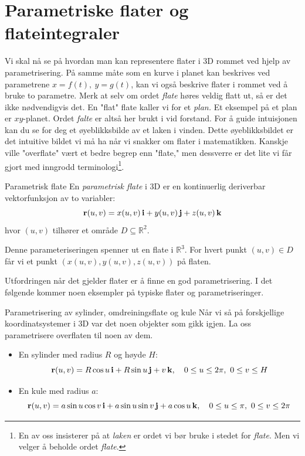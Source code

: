 \section{Parametriske flater og flateintegraler}

Vi skal nå se på hvordan man kan representere flater i 3D rommet ved hjelp av parametrisering. På samme måte som en kurve i planet kan beskrives ved parametrene \( x = f(t),\ y = g(t) \), kan vi også beskrive flater i rommet ved å bruke to parametre. Merk at selv om ordet \textit{flate} høres veldig flatt ut, så er det ikke nødvendigvis det. En "flat" flate kaller vi for et \textit{plan.} Et eksempel på et plan er $xy$-planet. 
Ordet \textit{falte} er altså her brukt i vid forstand. For å guide intuisjonen kan du se for deg et øyeblikksbilde av et laken i vinden. Dette øyeblikksbildet er det intuitive bildet vi må ha når vi snakker om flater i matematikken. Kanskje ville "overflate" vært et bedre begrep enn "flate," men dessverre er det lite vi får gjort med inngrodd terminologi\footnote{En av oss insisterer på at \textit{laken} er ordet vi bør bruke i stedet for \textit{flate}. Men vi velger å beholde ordet \textit{flate}.}.


\begin{defn}{Parametrisk flate}
En \emph{parametrisk flate} i 3D er en kontinuerlig deriverbar vektorfunksjon av to variabler:
\[
\mathbf{r}(u, v) = x(u, v)\, \mathbf{i} + y(u, v)\, \mathbf{j} + z(u, v)\, \mathbf{k}
\]
hvor \( (u, v) \) tilhører et område \( D \subseteq \mathbb{R}^2 \).

Denne parameteriseringen spenner ut en flate i \( \mathbb{R}^3 \). For hvert punkt \( (u, v) \in D \) får vi et punkt \( (x(u,v), y(u,v), z(u,v)) \) på flaten.
\end{defn}
Utfordringen når det gjelder flater er å finne en god parametrisering. I det følgende kommer noen eksempler på typiske flater og parametriseringer.
\begin{eks}{Parametrisering av sylinder, omdreiningsflate og kule}
Når vi så på forskjellige koordinatsystemer i 3D var det noen objekter som gikk igjen. La oss parametrisere overflaten til noen av dem. 
\begin{itemize}
    \item En sylinder med radius $R$ og høyde $H$:
    \[
    \mathbf{r}(u,v) = R\cos u\, \mathbf{i} + R\sin u\, \mathbf{j} + v\, \mathbf{k}, \quad 0 \leq u \leq 2\pi,\ 0 \leq v \leq H
    \]
    \item En kule med radius \( a \):
    \[
    \mathbf{r}(u,v) = a \sin u \cos v\, \mathbf{i} + a \sin u \sin v\, \mathbf{j} + a \cos u\, \mathbf{k}, \quad 0 \leq u \leq \pi,\ 0 \leq v \leq 2\pi
    \]
\end{itemize}
\end{eks}

